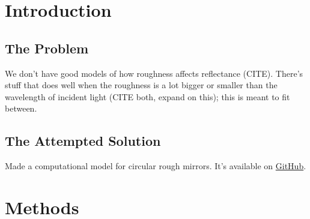 \documentclass[etd,oneside,senior]{BYUPhys}
\begin{document}
\frontmatter

\makepreliminarypages

\tableofcontents

\mainmatter






\chapter{Introduction} \label{chap:intro}

\section{The Problem} \label{sec:problem}

We don't have good models of how roughness affects reflectance (CITE). There's stuff that does well when the roughness is a lot bigger or smaller than the wavelength of incident light (CITE both, expand on this); this is meant to fit between.



\section{The Attempted Solution} \label{sec:attempted_solution}

Made a computational model for circular rough mirrors. It's available on \href{https://github.com/mjg0/Mirrors.jl}{GitHub}.







\chapter{Methods} \label{chap:math}
\end{document}
